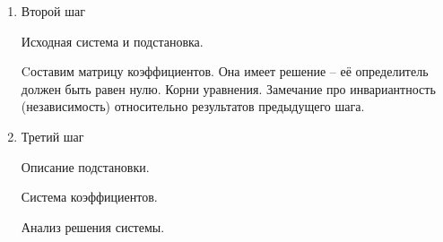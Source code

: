 \begin{itemize}
\begin{enumerate}
    \item{Второй шаг}

      Исходная система и подстановка.

      Cоставим матрицу коэффициентов. Она имеет решение -- её определитель должен быть равен нулю. Корни уравнения. Замечание про инвариантность (независимость) относительно результатов предыдущего шага.

    \item{Третий шаг}

      Описание подстановки. 

      Система коэффициентов.

      Анализ решения системы.
      
  \end{enumerate}



\end{itemize}
